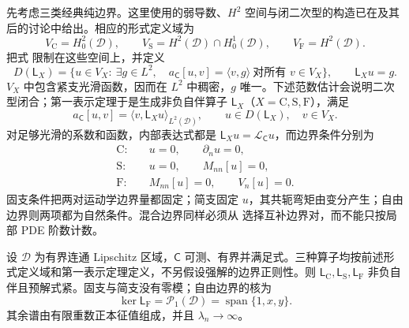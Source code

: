 先考虑三类经典纯边界。这里使用的弱导数、\(H^2\) 空间与闭二次型的构造已在及其后的讨论中给出。相应的形式定义域为
\[
 V_{\mathrm C}=H_0^2(\mathcal D),
 \qquad
 V_{\mathrm S}=H^2(\mathcal D)\cap H_0^1(\mathcal D),
 \qquad
 V_{\mathrm F}=H^2(\mathcal D).
\]
把式 限制在这些空间上，并定义
\[
 D(\mathsf L_X)=\{u\in V_X:\ \exists g\in L^2,\quad
 a_{\mathsf C}[u,v]=\langle v,g\rangle\ \text{对所有 }v\in V_X\},
 \qquad \mathsf L_Xu=g.
\]
$V_X$ 中包含紧支光滑函数，因而在 $L^2$ 中稠密，$g$ 唯一。下述范数估计会说明二次型闭合；第一表示定理于是生成非负自伴算子 \(\mathsf L_X\)（\(X=\mathrm C,\mathrm S,\mathrm F\)），满足
\begin{equation}
 a_{\mathsf C}[u,v]=\langle v,\mathsf L_Xu\rangle_{L^2(\mathcal D)},
 \qquad u\in D(\mathsf L_X),\quad v\in V_X.
 \label{eq:phys-cont-form-operator}
\end{equation}
对足够光滑的系数和函数，内部表达式都是 \(\mathsf L_Xu=\mathcal L_{\mathsf C}u\)，而边界条件分别为
\begin{align*}
 \mathrm C:&\quad u=0,\qquad \partial_nu=0,\\
 \mathrm S:&\quad u=0,\qquad M_{nn}[u]=0,\\
 \mathrm F:&\quad M_{nn}[u]=0,\qquad V_n[u]=0.
\end{align*}
固支条件把两对运动学边界量都固定；简支固定 \(u\)，其共轭弯矩由变分产生；自由边界则两项都为自然条件。混合边界同样必须从 选择互补边界对，而不能只按局部 PDE 阶数计数。

\begin{theorem}[经典边界下的离散谱与自由零模]
\label{thm:phys-cont-biharmonic-spectrum}
设 $\mathcal D$ 为有界连通 Lipschitz 区域，$\mathsf C$ 可测、有界并满足式。三种算子均按前述形式定义域和第一表示定理定义，不另假设强解的边界正则性。则 \(\mathsf L_{\mathrm C},\mathsf L_{\mathrm S},\mathsf L_{\mathrm F}\) 非负自伴且预解式紧。固支与简支没有零模；自由边界的核为
\begin{equation}
 \ker \mathsf L_{\mathrm F}
 =\mathcal P_1(\mathcal D)
 =\operatorname{span}\{1,x,y\}.
 \label{eq:phys-cont-free-kernel}
\end{equation}
其余谱由有限重数正本征值组成，并且 \(\lambda_n\to\infty\)。
\end{theorem}

